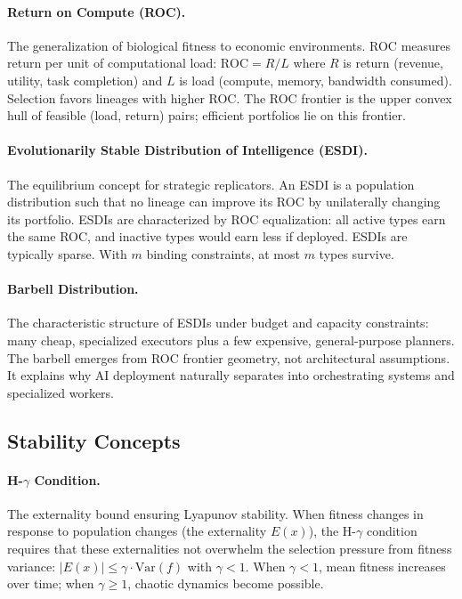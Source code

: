 \documentclass[12pt]{article}
\newcommand{\ROC}{\mathrm{ROC}}
\newcommand{\Var}{\mathrm{Var}}
\begin{document}
\paragraph{Return on Compute (ROC).} The generalization of biological fitness to economic environments. ROC measures return per unit of computational load: $\ROC = R/L$ where $R$ is return (revenue, utility, task completion) and $L$ is load (compute, memory, bandwidth consumed). Selection favors lineages with higher ROC. The ROC frontier is the upper convex hull of feasible (load, return) pairs; efficient portfolios lie on this frontier.

\paragraph{Evolutionarily Stable Distribution of Intelligence (ESDI).} The equilibrium concept for strategic replicators. An ESDI is a population distribution such that no lineage can improve its ROC by unilaterally changing its portfolio. ESDIs are characterized by ROC equalization: all active types earn the same ROC, and inactive types would earn less if deployed. ESDIs are typically sparse. With $m$ binding constraints, at most $m$ types survive.

\paragraph{Barbell Distribution.} The characteristic structure of ESDIs under budget and capacity constraints: many cheap, specialized executors plus a few expensive, general-purpose planners. The barbell emerges from ROC frontier geometry, not architectural assumptions. It explains why AI deployment naturally separates into orchestrating systems and specialized workers.

\subsection{Stability Concepts}

\paragraph{H-$\gamma$ Condition.} The externality bound ensuring Lyapunov stability. When fitness changes in response to population changes (the externality $E(x)$), the H-$\gamma$ condition requires that these externalities not overwhelm the selection pressure from fitness variance: $|E(x)| \leq \gamma \cdot \Var(f)$ with $\gamma < 1$. When $\gamma < 1$, mean fitness increases over time; when $\gamma \geq 1$, chaotic dynamics become possible.
\end{document}
